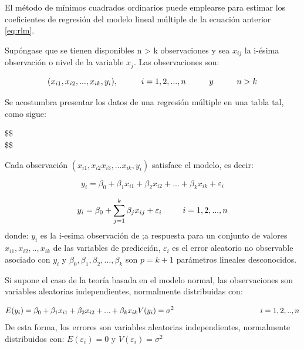 \documentclass[
]{book}
\begin{document}
El método de mínimos cuadrados ordinarios puede emplearse para estimar los coeficientes de regresión del modelo lineal múltiple de la ecuación anterior \eqref{eq:rlm}.

Supóngase que se tienen disponibles n \textgreater{} k observaciones y sea \(x_{ij}\) la i-ésima observación o nivel de la variable \(x_{j}\). Las observaciones son:

\[
\begin{equation}
(x_{i1},x_{i2}, ..., x_{ik}, y_{i}),\hspace{1.0cm} i = 1,2, ... , n \hspace{1.0cm}y\hspace{1.0cm} n  > k
\end{equation}
\]

Se acostumbra presentar los datos de una regresión múltiple en una tabla tal, como sigue:

\$\$
\begin{equation}

\end{equation}
\$\$

Cada observación \((x_{i1}, x_{i2}x_{i3},...x_{ik}, y_{i})\) satisface el modelo, es decir:

\[
\begin{equation}
y_{i}=\beta_{0}+\beta_{1}x_{i1}+\beta_{2}x_{i2}+ ... + \beta_{k}x_{ik}+\varepsilon_{i}
\label{eq:rlme}
\end{equation}
\]

\[
\begin{equation}
y_{i}=\beta_{0}+\sum_{j=1}^{k}\beta_{j}x_{ij} + \varepsilon_{i}\hspace{0.9cm} i=1,2,...,n 
\end{equation}
\]
donde: \(y_i\) es la i-esima observación de ;a respuesta para un conjunto de valores \(x_{i1},x_{i2},..,x_{ik}\) de las variables de predicción, \(\varepsilon_{i}\) es el error aleatorio no observable asociado con \(y_{i}\) y \(\beta_{0},\beta_{1},\beta_{2},...,\beta_{k}\) son \(p = k + 1\) parámetros lineales desconocidos.

Si supone el caso de la teoría basada en el modelo normal, las observaciones son variables aleatorias independientes, normalmente distribuidas con:

\[
\begin{equation}
E(y_{i})=\beta_{0}+\beta_{1}x_{i1}+\beta_{2}x_{i2}+...+\beta_{k}x_{ik} \\
V(y_{i})= \sigma^2  \hspace{4cm}
i =1,2,..,n \\
\label{eq:modelo-normal-de-variables}
\end{equation}
\] De esta forma, los errores son variables aleatorias independientes, normalmente distribuidos con: \(E(\varepsilon_{i})= 0\) y \(V(\varepsilon_{i})= \sigma^2\)
\end{document}
